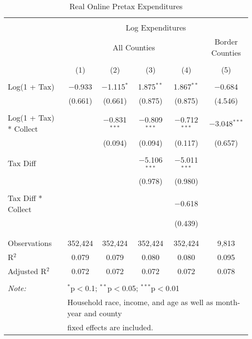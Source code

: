 
\begin{table}[!htbp] \centering 
  \caption{Real Online Pretax Expenditures} 
  \label{} 
\begin{tabular}{@{\extracolsep{5pt}}lccccc} 
\\[-1.8ex]\hline 
\hline \\[-1.8ex] 
 & \multicolumn{5}{c}{Log Expenditures} \\ 
\cline{2-6} 
 & \multicolumn{4}{c}{All Counties} & Border Counties \\ 
\\[-1.8ex] & (1) & (2) & (3) & (4) & (5)\\ 
\hline \\[-1.8ex] 
 Log(1 + Tax) & $-$0.933 & $-$1.115$^{*}$ & 1.875$^{**}$ & 1.867$^{**}$ & $-$0.684 \\ 
  & (0.661) & (0.661) & (0.875) & (0.875) & (4.546) \\ 
  & & & & & \\ 
 Log(1 + Tax) * Collect &  & $-$0.831$^{***}$ & $-$0.809$^{***}$ & $-$0.712$^{***}$ & $-$3.048$^{***}$ \\ 
  &  & (0.094) & (0.094) & (0.117) & (0.657) \\ 
  & & & & & \\ 
 Tax Diff &  &  & $-$5.106$^{***}$ & $-$5.011$^{***}$ &  \\ 
  &  &  & (0.978) & (0.980) &  \\ 
  & & & & & \\ 
 Tax Diff * Collect &  &  &  & $-$0.618 &  \\ 
  &  &  &  & (0.439) &  \\ 
  & & & & & \\ 
\hline \\[-1.8ex] 
Observations & 352,424 & 352,424 & 352,424 & 352,424 & 9,813 \\ 
R$^{2}$ & 0.079 & 0.079 & 0.080 & 0.080 & 0.095 \\ 
Adjusted R$^{2}$ & 0.072 & 0.072 & 0.072 & 0.072 & 0.078 \\ 
\hline 
\hline \\[-1.8ex] 
\textit{Note:}  & \multicolumn{5}{l}{$^{*}$p$<$0.1; $^{**}$p$<$0.05; $^{***}$p$<$0.01} \\ 
 & \multicolumn{5}{l}{Household race, income, and age as well as month-year and county} \\ 
 & \multicolumn{5}{l}{fixed effects are included.} \\ 
\end{tabular} 
\end{table} 
